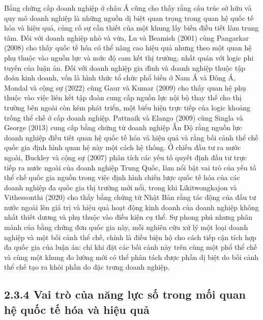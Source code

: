 \documentclass[
  a4paper,
  13pt]{extreport}
\begin{document}
Bằng chứng cấp doanh nghiệp ở châu Á cũng cho thấy rằng cấu trúc sở hữu
và quy mô doanh nghiệp là những nguồn dị biệt quan trọng trong quan hệ
quốc tế hóa và hiệu quả, củng cố sự cần thiết của một khung lấy biến
điều tiết làm trung tâm. Đối với doanh nghiệp nhỏ và vừa, Lu và Beamish
(2001) cùng Pangarkar (2008) cho thấy quốc tế hóa có thể nâng cao hiệu
quả nhưng theo một quan hệ phụ thuộc vào nguồn lực và mức độ cam kết thị
trường, nhất quán với logic phi tuyến của luận án. Đối với doanh nghiệp
gia đình và doanh nghiệp thuộc tập đoàn kinh doanh, vốn là hình thức tổ
chức phổ biến ở Nam Á và Đông Á, Mondal và cộng sự (2022) cùng Gaur và
Kumar (2009) cho thấy quan hệ phụ thuộc vào việc liên kết tập đoàn cung
cấp nguồn lực nội bộ thay thế cho thị trường bên ngoài còn kém phát
triển, một biểu hiện trực tiếp của logic khoảng trống thể chế ở cấp
doanh nghiệp. Pattnaik và Elango (2009) cùng Singla và George (2013)
cung cấp bằng chứng từ doanh nghiệp Ấn Độ rằng nguồn lực doanh nghiệp
điều tiết quan hệ quốc tế hóa và hiệu quả và rằng bối cảnh thể chế quốc
gia định hình quan hệ này một cách hệ thống. Ở chiều đầu tư ra nước
ngoài, Buckley và cộng sự (2007) phân tích các yếu tố quyết định đầu tư
trực tiếp ra nước ngoài của doanh nghiệp Trung Quốc, làm nổi bật vai trò
của yếu tố thể chế quốc gia nguồn trong việc định hình chiến lược quốc
tế hóa của các doanh nghiệp đa quốc gia thị trường mới nổi, trong khi
Likitwongkajon và Vithessonthi (2020) cho thấy bằng chứng từ Nhật Bản
rằng tác động của đầu tư nước ngoài lên giá trị và hiệu quả hoạt động
kinh doanh của doanh nghiệp không nhất thiết dương và phụ thuộc vào điều
kiện cụ thể. Sự phong phú nhưng phân mảnh của bằng chứng đơn quốc gia
này, mỗi nghiên cứu xử lý một loại doanh nghiệp và một bối cảnh thể chế,
chính là điều biện hộ cho cách tiếp cận tích hợp đa quốc gia của luận
án: chỉ khi đặt các bối cảnh này trên cùng một phổ thể chế và cùng một
khung đo lường mới có thể phân tách được phần dị biệt do bối cảnh thể
chế tạo ra khỏi phần do đặc trưng doanh nghiệp.

\hypertarget{vai-truxf2-cux1ee7a-nux103ng-lux1ef1c-sux1ed1-trong-mux1ed1i-quan-hux1ec7-quux1ed1c-tux1ebf-huxf3a-vuxe0-hiux1ec7u-quux1ea3}{%
\subsection{2.3.4 Vai trò của năng lực số trong mối quan hệ quốc tế hóa
và hiệu
quả}\label{vai-truxf2-cux1ee7a-nux103ng-lux1ef1c-sux1ed1-trong-mux1ed1i-quan-hux1ec7-quux1ed1c-tux1ebf-huxf3a-vuxe0-hiux1ec7u-quux1ea3}}
\end{document}
